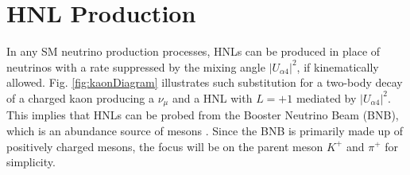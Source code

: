 
 
\section{HNL Production}
\label{sec2Production}
In any SM neutrino production processes, HNLs can be produced in place of neutrinos with a rate suppressed by the mixing angle $|U_{\alpha4}|^{2}$, if kinematically allowed. 
Fig. \ref{fig:kaonDiagram} illustrates such substitution for a two-body decay of a charged kaon producing a $\nu_{\mu}$ and a HNL with $L = +1$ mediated by $|U_{\alpha4}|^{2}$. 
This implies that HNLs can be probed from the Booster Neutrino Beam (BNB), which is an abundance source of mesons \cite{BNBFlux}.
Since the BNB is primarily made up of positively charged mesons, the focus will be on the parent meson $K^+$ and $\pi^+$ for simplicity.  

